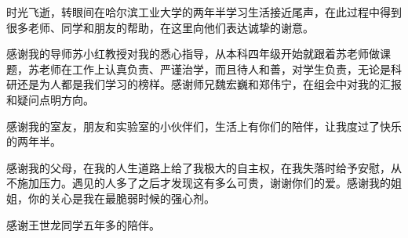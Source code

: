 \begin{acknowledgements}

时光飞逝，转眼间在哈尔滨工业大学的两年半学习生活接近尾声，在此过程中得到很多老师、同学和朋友的帮助，在这里向他们表达诚挚的谢意。

感谢我的导师苏小红教授对我的悉心指导，从本科四年级开始就跟着苏老师做课题，苏老师在工作上认真负责、严谨治学，而且待人和善，对学生负责，无论是科研还是为人都是我们学习的榜样。感谢师兄魏宏巍和郑伟宁，在组会中对我的汇报和疑问点明方向。

感谢我的室友，朋友和实验室的小伙伴们，生活上有你们的陪伴，让我度过了快乐的两年半。

感谢我的父母，在我的人生道路上给了我极大的自主权，在我失落时给予安慰，从不施加压力。遇见的人多了之后才发现这有多么可贵，谢谢你们的爱。感谢我的姐姐，你的关心是我在最脆弱时候的强心剂。

感谢王世龙同学五年多的陪伴。



\end{acknowledgements}
